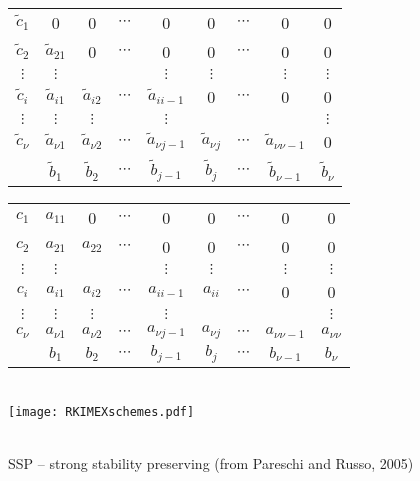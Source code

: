 \begin{slide}
\ \\
\begin{tabular}{c|cccccccc}
$\tilde{c}_1$& 0 & 0 & $\cdots$ & 0 & 0 & $\cdots$ & 0 & 0\\
$\tilde{c}_2$& $\tilde{a}_{21}$ & 0 & $\cdots$ & 0 & 0 & $\cdots$ & 0 & 0\\
$\vdots$& $\vdots$ &  & & $\vdots$& $\vdots$ & & $\vdots$ & $\vdots$\\
$\tilde{c}_i$& $\tilde{a}_{i1}$ & $\tilde{a}_{i2}$ & $\cdots$ & $\tilde{a}_{ii-1}$ & 0 & $\cdots$ & 0 & 0\\
$\vdots$& $\vdots$ & $\vdots$ & & $\vdots$ & & & & $\vdots$\\
$\tilde{c}_\nu$& $\tilde{a}_{\nu 1}$ & $\tilde{a}_{\nu 2}$ & $\cdots$ & $\tilde{a}_{\nu j-1}$ & $\tilde{a}_{\nu j}$ & $\cdots$ & $\tilde{a}_{\nu\nu-1}$ & 0\\
\hline
& $\tilde{b}_1$ & $\tilde{b}_2$ & $\cdots$ & $\tilde{b}_{j-1}$ & $\tilde{b}_j$ & $\cdots$ & $\tilde{b}_{\nu-1}$ & $\tilde{b}_\nu$\\
\end{tabular}
\hspace{1cm}
\begin{tabular}{c|cccccccc}
$c_1$& {\color{red} $a_{11}$} & 0 & $\cdots$ & 0 & 0 & $\cdots$ & 0 & 0\\
$c_2$& ${a}_{21}$ & {\color{red} $a_{22}$} & $\cdots$ & 0 & 0 & $\cdots$ & 0 & 0\\
$\vdots$& $\vdots$ &  & & $\vdots$& $\vdots$ & & $\vdots$ & $\vdots$\\
$c_i$& ${a}_{i1}$ & ${a}_{i2}$ & $\cdots$ & ${a}_{ii-1}$ & {\color{red} $a_{ii}$} & $\cdots$ & 0 & 0\\
$\vdots$& $\vdots$ & $\vdots$ & & $\vdots$ & & & & $\vdots$\\
$c_\nu$& ${a}_{\nu 1}$ & ${a}_{\nu 2}$ & $\cdots$ & ${a}_{\nu j-1}$ & ${a}_{\nu j}$ & $\cdots$ & ${a}_{\nu\nu-1}$ & {\color{red} $a_{\nu\nu}$}\\
\hline
& ${b}_1$ & ${b}_2$ & $\cdots$ & ${b}_{j-1}$ & ${b}_j$ & $\cdots$ & ${b}_{\nu-1}$ & ${b}_\nu$\\
\end{tabular}
\end{slide}

\begin{slide}

\ \\
\texttt{[image: RKIMEXschemes.pdf]}

\ \\
SSP -- strong stability preserving (from Pareschi and Russo, 2005)
\end{slide}


